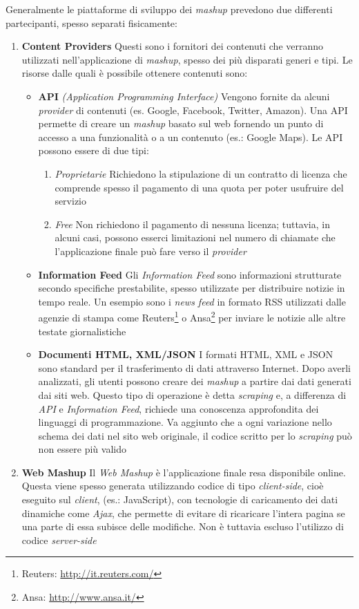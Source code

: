 Generalmente le piattaforme di sviluppo dei \emph{mashup} prevedono due differenti partecipanti, spesso separati fisicamente:

\begin{enumerate}
	\item \textbf{Content Providers}
	Questi sono i fornitori dei contenuti che verranno utilizzati nell'applicazione di \emph{mashup}, spesso dei più disparati generi e tipi.
	Le risorse dalle quali è possibile ottenere contenuti sono:
	\begin{itemize}
		\item \textbf{API}
		\emph{(Application Programming Interface)} Vengono fornite da alcuni \emph{provider} di contenuti (es. Google, Facebook, Twitter, Amazon). Una API permette di creare un \emph{mashup} basato sul web fornendo un punto di accesso a una funzionalità o a un contenuto (es.: Google Maps). Le API possono essere di due tipi:
		\begin{enumerate}
			\item \emph{Proprietarie}
			Richiedono la stipulazione di un contratto di licenza che comprende spesso il pagamento di una quota per poter usufruire del servizio
			\item \emph{Free}
			Non richiedono il pagamento di nessuna licenza; tuttavia, in alcuni casi, possono esserci limitazioni nel numero di chiamate che l'applicazione finale può fare verso il \emph{provider}
		\end{enumerate} 
		\item \textbf{Information Feed}
		Gli \emph{Information Feed} sono informazioni strutturate secondo specifiche prestabilite, spesso utilizzate per distribuire notizie in tempo reale. Un esempio sono i \emph{news feed }in formato RSS utilizzati dalle agenzie di stampa come Reuters\footnote{Reuters: \url{http://it.reuters.com/}} o Ansa\footnote{Ansa: \url{http://www.ansa.it/}} per inviare le notizie alle altre testate giornalistiche
		\item \textbf{Documenti HTML, XML/JSON}
		I formati HTML, XML e JSON sono standard per il trasferimento di dati attraverso Internet. Dopo averli analizzati, gli utenti possono creare dei \emph{mashup} a partire dai dati generati dai siti web. Questo tipo di operazione è detta \emph{scraping} e, a differenza di \emph{API} e \emph{Information Feed}, richiede una conoscenza approfondita dei linguaggi di programmazione. Va aggiunto che a ogni variazione nello schema dei dati nel sito web originale, il codice scritto per lo \emph{scraping} può non essere più valido
	\end{itemize} 
	\item \textbf{Web Mashup}
	Il \emph{Web Mashup} è l'applicazione finale resa disponibile online. Questa viene spesso generata utilizzando codice di tipo \emph{client-side}, cioè eseguito sul \emph{client}, (es.: JavaScript), con tecnologie di caricamento dei dati dinamiche come \emph{Ajax}, che permette di evitare di ricaricare l'intera pagina se una parte di essa subisce delle modifiche. Non è tuttavia escluso l'utilizzo di codice \emph{server-side}
\end{enumerate}

